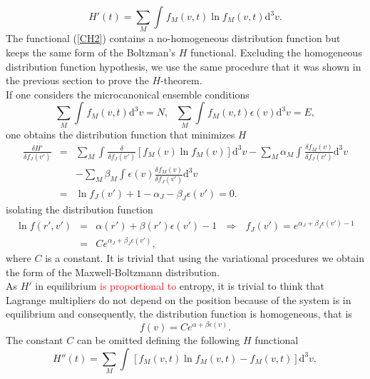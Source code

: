 \documentclass{article}
\begin{document}
\begin{equation}
   H'(t)=\sum_M\int_{}^{} f_M(v,t) \ln f_M(v,t)\mathrm{d}^3v  \label{CH2}.
\end{equation}
The functional (\ref{CH2}) contains a no-homogeneous distribution function but keeps the same form of the Boltzman's $H$ functional. Excluding the homogeneous distribution function hypothesis, we use the same procedure that it was shown in the previous section to prove the $H$-theorem.\\ 
If one considers the microcanonical ensemble conditions 
\begin{equation}
    \sum_M\int_{}^{}f_M(v,t)\mathrm{d}^3v =N, \ \ \ \sum_M\int_{}^{}f_M(v,t)\epsilon(v)\mathrm{d}^3v =E \label{micro},
\end{equation}{}
one obtains the distribution function that minimizes $H$
\begin{eqnarray}
\frac{\delta H'}{\delta f_J(v')}&=&\sum_M\int_{}^{}\frac{\delta}{\delta f_J(v')}\left[f_M(v)\ln f_M(v)  \right]\mathrm{d}^3v -\sum_M\alpha_M\int_{}^{}\frac{\delta f_M(v)}{\delta f_J(v')}\mathrm{d}^3v \nonumber \\
&&-\sum_M\beta_M \int_{}^{}\epsilon(v)\frac{\delta f_M(v)}{\delta f_J(v')}\mathrm{d}^3v \nonumber \\
&=&\ln f_J(v')+1-\alpha_J-\beta_J \epsilon(v')=0.
\end{eqnarray}{}
isolating the distribution function 
\begin{eqnarray}
\ln f(r',v')&=&\alpha(r')+\beta(r') \epsilon(v')-1 \ \ \  \Rightarrow \ \ \ f_J(v')=e^{\alpha_J +\beta_J \epsilon(v')-1} \nonumber \\
&=&Ce^{\alpha_J+\beta_J \epsilon(v') } \label{relacion1},
\end{eqnarray}{}
where $C$ is a constant. It is trivial that using the variational procedures we obtain the form of the Maxwell-Boltzmann distribution. \\
As $H'$ in equilibrium \textcolor{red}{is proportional to} entropy, it is trivial to think that Lagrange multipliers do not depend on the position because of the system is in equilibrium and consequently, the distribution function is homogeneous, that is
\begin{equation}
    f(v)=Ce^{\alpha+\beta \epsilon(v)}.
\end{equation}{} 
The constant $C$ can be omitted defining the following $H$ functional
\begin{equation}
   H''(t)=\sum_M\int_{}^{} \left[f_M(v,t) \ln f_M(v,t)-f_M(v,t)\right]\mathrm{d}^3v  \label{CH3},
\end{equation}{}
\end{document}
